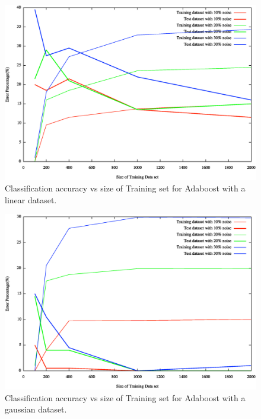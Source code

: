 \documentclass[letterpaper,11pt]{article}
\begin{document}
\begin{figure}[H]
  \centering
  \includegraphics[width=140mm]{sizeVsAccuracy-linear.eps}
  \caption{Classification accuracy vs size of Training set for Adaboost with a linear dataset.}
  \label{fig:sizeVsAccuracylinear}
\end{figure}

\begin{figure}[H]
  \centering
  \includegraphics[width=140mm]{sizeVsAccuracy-gaussian.eps}
  \caption{Classification accuracy vs size of Training set for Adaboost with a gaussian dataset.}
  \label{fig:sizeVsAccuracygaussian}
\end{figure}
\end{document}
